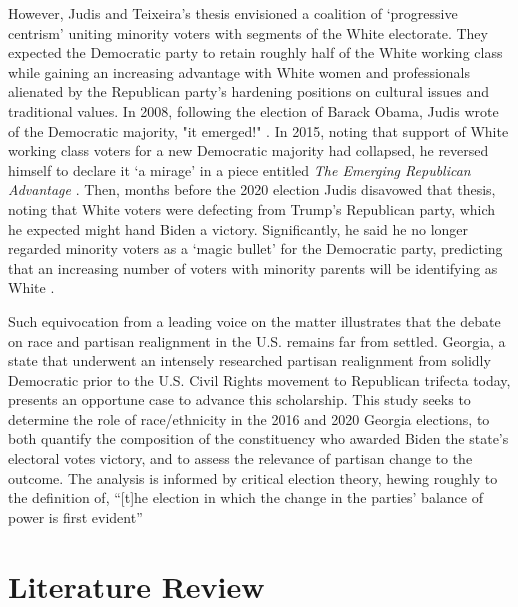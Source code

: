 However, Judis and Teixeira's thesis envisioned a coalition of `progressive centrism' uniting minority voters with segments of the White electorate. They expected the Democratic party to retain roughly half of the White working class while gaining an increasing advantage with White women and professionals alienated by the Republican party's hardening positions on cultural issues and traditional values. In 2008, following the election of Barack Obama, Judis wrote of the Democratic majority, "it emerged!" \citep{judis_america_2008}. In 2015, noting that support of White working class voters for a new Democratic majority had collapsed, he reversed himself to declare it `a mirage' in a piece entitled \textit{The Emerging Republican Advantage} \citep{judis_emerging_2015}. Then, months before the 2020 election Judis disavowed that thesis, noting that White voters were defecting from Trump's Republican party, which he expected might hand Biden a victory. Significantly, he said he no longer regarded minority voters as a `magic bullet' for the Democratic party, predicting that an increasing number of voters with minority parents will be identifying as White \citep{judis_talking_2020}.   

Such equivocation from a leading voice on the matter illustrates that the debate on race and partisan realignment in the U.S. remains far from settled. Georgia, a state that underwent an intensely researched partisan realignment from solidly Democratic prior to the U.S. Civil Rights movement to Republican trifecta today, presents an opportune case to advance this scholarship. This study seeks to determine the role of race/ethnicity in the 2016 and 2020 Georgia elections, to both quantify the composition of the constituency who awarded Biden the state's electoral votes victory, and to assess the relevance of partisan change to the outcome. The analysis is informed by critical election theory, hewing roughly to the definition of, ``[t]he election in which the change in the parties' balance of power is first evident'' \citep[pg. 362]{campbell_party_2006}

\section{Literature Review}

